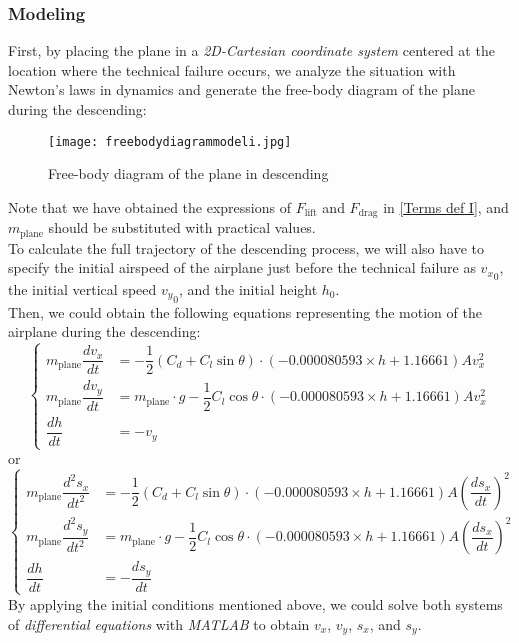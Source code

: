 \documentclass[a4paper,11pt]{article}
\begin{document}
\begin{spacing}{1.0}
\begin{enumerate}
	
	
	
\end{enumerate}

\subsubsection{Modeling}
First, by placing the plane in a \textit{2D-Cartesian coordinate system} centered at the location where the technical failure occurs, we analyze the situation with Newton's laws in dynamics and generate the free-body diagram of the plane during the descending:
\begin{figure}[H]
	\centering
	\texttt{[image: freebodydiagrammodeli.jpg]}
	\caption{Free-body diagram of the plane in descending}
\end{figure}
\noindent Note that we have obtained the expressions of $F_\text{lift}$ and $F_\text{drag}$ in \ref{Terms def I}, and $m_\text{plane}$ should be substituted with practical values. 
\\To calculate the full trajectory of the descending process, we will also have to specify the initial airspeed of the airplane just before the technical failure as ${v_x}_0$, the initial vertical speed ${v_y}_0$, and the initial height $h_0$.
\\Then, we could obtain the following equations representing the motion of the airplane during the descending:
\[
\left\{
\begin{aligned}
 m_\text{plane}\dfrac{dv_x}{dt} &= -\dfrac{1}{2}(C_d + C_l\sin\theta)\cdot(-0.000080593\times h + 1.16661)Av_x^2
\\ m_\text{plane}\dfrac{dv_y}{dt} &= m_\text{plane}\cdot g - \dfrac{1}{2}C_l\cos\theta\cdot(-0.000080593\times h + 1.16661)Av_x^2
\\ \dfrac{dh}{dt} &= -v_y
\end{aligned}
\right.
\]
or
\[
\left\{
\begin{aligned}
m_\text{plane}\dfrac{d^2s_x}{dt^2} &= -\dfrac{1}{2}(C_d + C_l\sin\theta)\cdot(-0.000080593\times h + 1.16661)A\left(\dfrac{ds_x}{dt}\right)^2
\\ m_\text{plane}\dfrac{d^2s_y}{dt^2} &= m_\text{plane}\cdot g - \dfrac{1}{2}C_l\cos\theta\cdot(-0.000080593\times h + 1.16661)A\left(\dfrac{ds_x}{dt}\right)^2
\\ \dfrac{dh}{dt} &= -\dfrac{ds_y}{dt}
\end{aligned}
\right.
\]
By applying the initial conditions mentioned above, we could solve both systems of \textit{differential equations} with \textit{MATLAB} to obtain $v_x$, $v_y$, $s_x$, and $s_y$.

\end{spacing}
\end{document}

